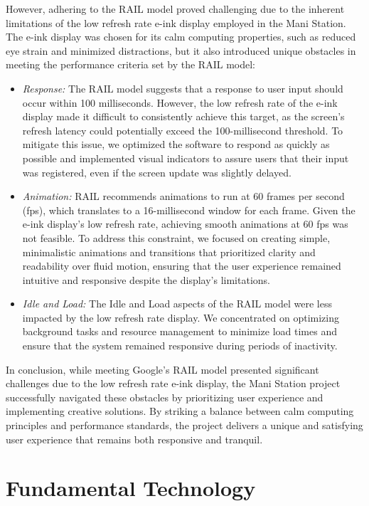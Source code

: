 \documentclass[letterpaper,twocolumn,10pt]{article}
\begin{document}
However, adhering to the RAIL model proved challenging due to the inherent limitations of the low refresh rate e-ink display employed in the Mani Station. The e-ink display was chosen for its calm computing properties, such as reduced eye strain and minimized distractions, but it also introduced unique obstacles in meeting the performance criteria set by the RAIL model:
\begin{itemize}
    \item \emph{Response:} The RAIL model suggests that a response to user input should occur within 100 milliseconds. However, the low refresh rate of the e-ink display made it difficult to consistently achieve this target, as the screen's refresh latency could potentially exceed the 100-millisecond threshold. To mitigate this issue, we optimized the software to respond as quickly as possible and implemented visual indicators to assure users that their input was registered, even if the screen update was slightly delayed.
    \item \emph{Animation:} RAIL recommends animations to run at 60 frames per second (fps), which translates to a 16-millisecond window for each frame. Given the e-ink display's low refresh rate, achieving smooth animations at 60 fps was not feasible. To address this constraint, we focused on creating simple, minimalistic animations and transitions that prioritized clarity and readability over fluid motion, ensuring that the user experience remained intuitive and responsive despite the display's limitations.
    \item \emph{Idle and Load:} The Idle and Load aspects of the RAIL model were less impacted by the low refresh rate display. We concentrated on optimizing background tasks and resource management to minimize load times and ensure that the system remained responsive during periods of inactivity.

\end{itemize}

In conclusion, while meeting Google's RAIL model presented significant challenges due to the low refresh rate e-ink display, the Mani Station project successfully navigated these obstacles by prioritizing user experience and implementing creative solutions. By striking a balance between calm computing principles and performance standards, the project delivers a unique and satisfying user experience that remains both responsive and tranquil.

\section{Fundamental Technology}
\end{document}
